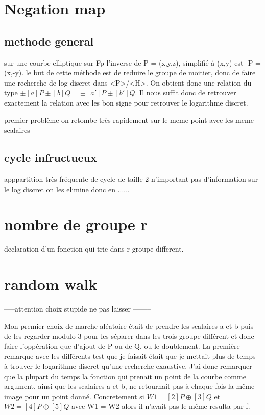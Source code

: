 \documentclass[a4paper,10pt]{report}
\begin{document}
{\chapter{Negation map}

\section{methode general}

sur une courbe elliptique sur Fp l'inverse de P = (x,y,z), simplifié à (x,y) est -P = (x,-y). le but de cette méthode est de reduire le groupe de moitier,
donc de faire une recherche de log discret dans <P>/<H>. On obtient donc une relation du type $\pm[a]P \pm[b]Q = \pm[a']P \pm[b']Q$. Il nous suffit donc de retrouver exactement 
la relation avec les bon signe pour retrouver le logarithme discret.

premier problème on retombe très rapidement sur le meme point avec les meme scalaires	

\section{cycle infructueux}

apppartition très fréquente de cycle de taille 2 n'important pas d'information sur le log discret on les elimine donc en ......

\chapter{nombre de groupe r}

declaration d'un fonction qui trie dans r groupe different.


\chapter{random walk}

-----attention choix stupide ne pas laisser --------

Mon premier choix de marche aléatoire était de prendre les scalaires a et b puis de les regarder modulo 3 pour les séparer dans les 
trois groupe différent et donc faire l'oppération que d'ajout de P ou de Q, ou le doublement.
La première remarque avec les différents test que je faisait était que je mettait plus de temps à trouver le logarithme discret
qu'une recherche exaustive. J'ai donc remarquer que la plupart du temps la fonction qui prenait un point de la courbe comme argument,
ainsi que les scalaires a et b, ne retournait pas à chaque fois la même image pour un point donné. Concretement si 
$W1 = [2]P \oplus [3]Q$ et $W2 = [4]P \oplus [5]Q$ avec W1 = W2 alors il n'avait pas le même resulta par f.

}
\end{document}
